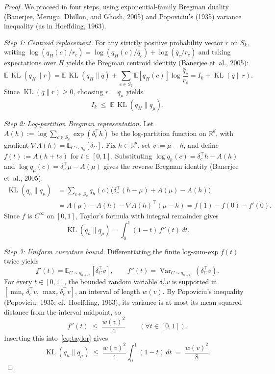\documentclass[11pt]{article}
\theoremstyle{plain}
\theoremstyle{definition}
\theoremstyle{remark}
\DeclareMathOperator{\KL}{KL}
\DeclareMathOperator{\Var}{Var}
\begin{document}
\begin{proof}
We proceed in four steps, using exponential-family Bregman duality (Banerjee, Merugu, Dhillon, and Ghosh, 2005) and Popoviciu's (1935) variance inequality (as in Hoeffding, 1963).

\emph{Step 1: Centroid replacement.}
For any strictly positive probability vector $r$ on $S_k$, writing $\log(q_H(c)/r_c) = \log(q_H(c)/\bar{q}_c) + \log(\bar{q}_c/r_c)$ and taking expectations over $H$ yields the Bregman centroid identity (Banerjee et~al., 2005):
\[
\mathbb{E}\,\KL(q_H \| r)
= \mathbb{E}\,\KL(q_H \| \bar{q}) + \sum_{c \in S_k} \mathbb{E}[q_H(c)] \log\frac{\bar{q}_c}{r_c}
= I_k + \KL(\bar{q} \| r).
\]
Since $\KL(\bar{q} \| r) \ge 0$, choosing $r = q_\mu$ yields
\begin{equation}\label{eq:centroid}
I_k \;\le\; \mathbb{E}\,\KL(q_H \| q_\mu).
\end{equation}

\emph{Step 2: Log-partition Bregman representation.}
Let $A(h) := \log \sum_{c \in S_k} \exp(\delta_c^\top h)$ be the log-partition function on $\mathbb{R}^d$, with gradient $\nabla A(h) = \mathbb{E}_{C \sim q_h}[\delta_C]$. Fix $h \in \mathbb{R}^d$, set $v := \mu - h$, and define $f(t) := A(h + tv)$ for $t \in [0, 1]$. Substituting $\log q_h(c) = \delta_c^\top h - A(h)$ and $\log q_\mu(c) = \delta_c^\top \mu - A(\mu)$ gives the reverse Bregman identity (Banerjee et~al., 2005):
\begin{align*}
\KL(q_h \| q_\mu)
&= \sum_{c \in S_k} q_h(c)\bigl(\delta_c^\top(h - \mu) + A(\mu) - A(h)\bigr) \\
&= A(\mu) - A(h) - \nabla A(h)^\top(\mu - h)
= f(1) - f(0) - f'(0).
\end{align*}
Since $f$ is $C^\infty$ on $[0, 1]$, Taylor's formula with integral remainder gives
\begin{equation}\label{eq:taylor}
\KL(q_h \| q_\mu) = \int_0^1 (1 - t)\,f''(t)\,dt.
\end{equation}

\emph{Step 3: Uniform curvature bound.}
Differentiating the finite log-sum-exp $f(t)$ twice yields
\[
f'(t) = \mathbb{E}_{C \sim q_{h+tv}}[\delta_C^\top v], \qquad
f''(t) = \Var_{C \sim q_{h+tv}}(\delta_C^\top v).
\]
For every $t \in [0, 1]$, the bounded random variable $\delta_C^\top v$ is supported in $[\min_c \delta_c^\top v,\, \max_c \delta_c^\top v]$, an interval of length $w(v)$. By Popoviciu's inequality (Popoviciu, 1935; cf.\ Hoeffding, 1963), its variance is at most its mean squared distance from the interval midpoint, so
\[
f''(t) \;\le\; \frac{w(v)^2}{4} \qquad (\forall t \in [0, 1]).
\]
Inserting this into~\eqref{eq:taylor} gives
\[
\KL(q_h \| q_\mu) \;\le\; \frac{w(v)^2}{4} \int_0^1 (1 - t)\,dt \;=\; \frac{w(v)^2}{8}.
\]


\end{proof}
\end{document}
